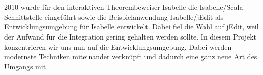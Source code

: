\section*{\abstractname}

2010 wurde für den interaktiven Theorembeweiser Isabelle die Isabelle/Scala Schnittstelle eingeführt
sowie die Beispielanwendung Isabelle/jEdit als Entwicklungsumgebung für Isabelle entwickelt. Dabei
fiel die Wahl auf jEdit, weil der Aufwand für die Integration gering gehalten werden sollte. In
diesem Projekt konzentrieren wir uns nun auf die Entwicklungsumgebung. Dabei werden modernste
Techniken miteinander verknüpft und dadurch eine ganz neue Art des Umgangs mit
